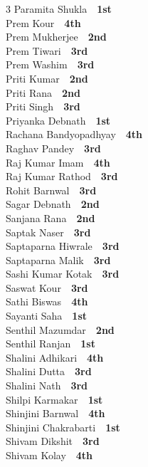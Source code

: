 \documentclass[11pt,a4paper]{article}
\begin{document}
\begin{multicols}{3}
Paramita Shukla~\dotfill~\textbf{1st}\\
Prem Kour~\dotfill~\textbf{4th}\\
Prem Mukherjee~\dotfill~\textbf{2nd}\\
Prem Tiwari~\dotfill~\textbf{3rd}\\
Prem Washim~\dotfill~\textbf{3rd}\\
Priti Kumar~\dotfill~\textbf{2nd}\\
Priti Rana~\dotfill~\textbf{2nd}\\
Priti Singh~\dotfill~\textbf{3rd}\\
Priyanka Debnath~\dotfill~\textbf{1st}\\
Rachana Bandyopadhyay~\dotfill~\textbf{4th}\\
Raghav Pandey~\dotfill~\textbf{3rd}\\
Raj Kumar Imam~\dotfill~\textbf{4th}\\
Raj Kumar Rathod~\dotfill~\textbf{3rd}\\
Rohit Barnwal~\dotfill~\textbf{3rd}\\
Sagar Debnath~\dotfill~\textbf{2nd}\\
Sanjana Rana~\dotfill~\textbf{2nd}\\
Saptak Naser~\dotfill~\textbf{3rd}\\
Saptaparna Hiwrale~\dotfill~\textbf{3rd}\\
Saptaparna Malik~\dotfill~\textbf{3rd}\\
Sashi Kumar Kotak~\dotfill~\textbf{3rd}\\
Saswat Kour~\dotfill~\textbf{3rd}\\
Sathi Biswas~\dotfill~\textbf{4th}\\
Sayanti Saha~\dotfill~\textbf{1st}\\
Senthil Mazumdar~\dotfill~\textbf{2nd}\\
Senthil Ranjan~\dotfill~\textbf{1st}\\
Shalini Adhikari~\dotfill~\textbf{4th}\\
Shalini Dutta~\dotfill~\textbf{3rd}\\
Shalini Nath~\dotfill~\textbf{3rd}\\
Shilpi Karmakar~\dotfill~\textbf{1st}\\
Shinjini Barnwal~\dotfill~\textbf{4th}\\
Shinjini Chakrabarti~\dotfill~\textbf{1st}\\
Shivam Dikshit~\dotfill~\textbf{3rd}\\
Shivam Kolay~\dotfill~\textbf{4th}\\

\end{multicols}
\end{document}
